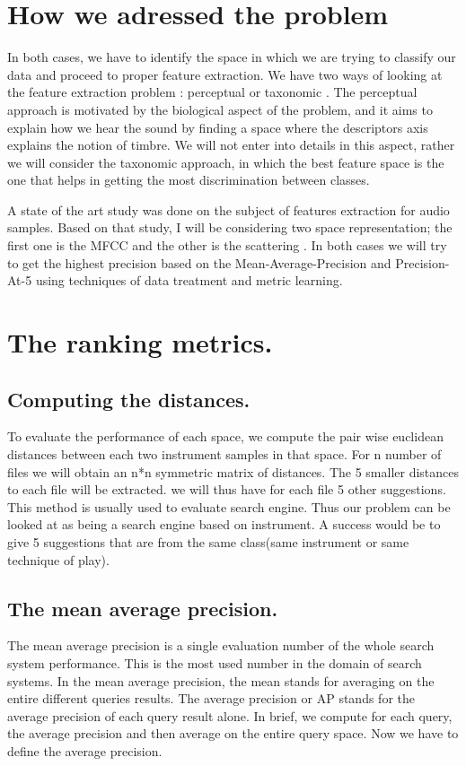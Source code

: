 \documentclass[hidelinks,12pt]{report}
\begin{document}
\section{How we adressed the problem}
In both cases, we have to identify the space in which we are trying to classify our data and proceed to proper feature extraction. We have two ways of looking at the feature extraction problem : perceptual or taxonomic \cite{P03}. The perceptual approach is motivated by the biological aspect of the problem, and it aims to explain how we hear the sound by finding a space where the descriptors axis explains the notion of timbre. We will not enter into details in this aspect, rather we will consider the taxonomic approach, in which the best feature space is the one that helps in getting the most discrimination between classes.\par
A state of the art study was done on the subject of features extraction for audio samples. Based on that study, I will be considering two space representation; the first one is the MFCC and the other is the scattering \cite{AM11}. In both cases we will try to get the highest precision based on the Mean-Average-Precision and Precision-At-5 using techniques of data treatment and metric learning. 

\section{The ranking metrics.}
\subsection{Computing the distances.}
To evaluate the performance of each space, we compute the pair wise euclidean distances between each two instrument samples in that space. For n number of files we will obtain an n*n symmetric matrix of distances. The 5 smaller distances to each file  will be extracted. we will thus have for each file 5 other suggestions. This method is usually used to evaluate search engine. Thus our problem can be looked at as being a search engine based on instrument. A success would be to give 5 suggestions that are from the same class(same instrument or same technique of play).
\subsection{The mean average precision.}
The mean average precision is a single evaluation number of the whole search system performance. This is the most used number in the domain of search systems. In the mean average precision, the mean stands for averaging on the entire different queries results. The average precision or AP stands for the average precision of each query result alone. In brief, we compute for each query, the average precision and then average on the entire query space. Now we have to define the average precision.
\end{document}

